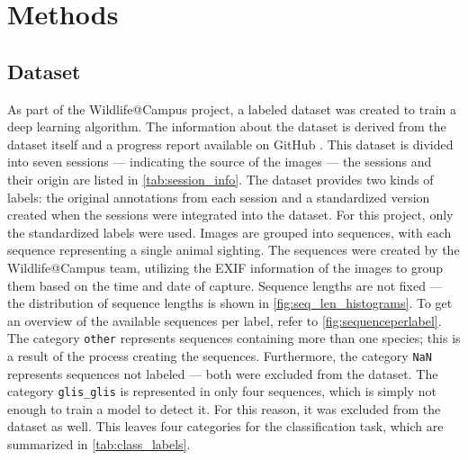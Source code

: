 

\section{Methods}
\label{methods}

    \subsection{Dataset}
    As part of the Wildlife@Campus project, a labeled dataset was created to train a deep learning algorithm.
    The information about the dataset is derived from the dataset itself and a progress report available on GitHub \autocite{ratnaweeraWildlifeCampusProgressReports2021}.
    This dataset is divided into seven sessions --- indicating the source of the images --- the sessions and their origin are listed in \autoref{tab:session_info}.
    The dataset provides two kinds of labels: the original annotations from each session and a standardized version created when the sessions were integrated into the dataset.
    For this project, only the standardized labels were used.
    Images are grouped into sequences, with each sequence representing a single animal sighting.
    The sequences were created by the Wildlife@Campus team, utilizing the \ac{EXIF} information of the images to group them based on the time and date of capture.
    Sequence lengths are not fixed --- the distribution of sequence lengths is shown in \autoref{fig:seq_len_histograms}.
    To get an overview of the available sequences per label, refer to \autoref{fig:sequenceperlabel}.
    The category \texttt{other} represents sequences containing more than one species; this is a result of the process creating the sequences.
    Furthermore, the category \texttt{NaN} represents sequences not labeled --- both were excluded from the dataset.
    The category \texttt{glis\_glis} is represented in only four sequences, which is simply not enough to train a model to detect it.
    For this reason, it was excluded from the dataset as well.
    This leaves four categories for the classification task, which are summarized in \autoref{tab:class_labels}.

